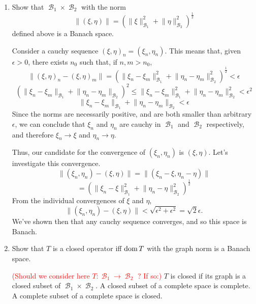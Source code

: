 \documentclass{article}
\theoremstyle{exercisestyle}
\newenvironment{exercise}[1]
  {\renewcommand\theinnerex{#1}\innerex}
  {\endinnerex}
\DeclareMathOperator{\banach}{\mathcal{B}}
\newcommand{\norm}[1]{\lVert #1 \rVert}
\begin{document}
\begin{exercise}{1.2.9}


    \begin{enumerate}

        \item Show that $\banach_1 \times \banach_2$ with the norm
              $$\norm{(\xi, \eta)} = \left(\norm{\xi}^2_{\banach_1} + \norm{\eta}^2_{\banach_2}\right)^{\frac{1}{2}}$$
              defined above is a Banach space.

              Consider a cauchy sequence $(\xi,\eta)_n=(\xi_n, \eta_n)$. This means that, given $\epsilon>0$, there exists $n_0$ such that, if $n, m > n_0$,
              $$ \norm{(\xi,\eta)_n - (\xi,\eta)_m} = \left(\norm{\xi_n - \xi_m}^2_{\banach_1} + \norm{\eta_n-\eta_m}^2_{\banach_2}\right)^{\frac{1}{2}} < \epsilon$$
              $$ \left(\norm{\xi_n-\xi_m}_{\banach_1} + \norm{\eta_n - \eta_m}_{\banach_2}\right)^2 \leq \norm{\xi_n-\xi_m}^2_{\banach_1} + \norm{\eta_n - \eta_m}^2_{\banach_2} < \epsilon^2$$
              $$ \norm{\xi_n-\xi_m}_{\banach_1} + \norm{\eta_n - \eta_m}_{\banach_2} < \epsilon$$
              Since the norms are necessarily positive, and are both smaller than arbitrary $\epsilon$, we can conclude that $\xi_n$ and $\eta_n$ are cauchy
              in $\banach_1$ and $\banach_2$ respectively, and therefore $\xi_n \to \xi$ and $\eta_n \to \eta$.

              Thus, our candidate for the convergence of $(\xi_n,\eta_n)$ is $(\xi,\eta)$. Let's investigate this convergence.
              $$ \norm{(\xi_n,\eta_n) - (\xi,\eta)} = \norm{(\xi_n-\xi,\eta_n-\eta)} $$
              $$ = \left(\norm{\xi_n-\xi}^2_{\banach_1} + \norm{\eta_n-\eta}^2_{\banach_2}\right)^{\frac{1}{2}}$$
              From the individual convergences of $\xi$ and $\eta$,
              $$ \norm{(\xi_n,\eta_n) - (\xi,\eta)} < \sqrt{\epsilon^2 + \epsilon^2} = \sqrt{2} \epsilon. $$
              We've shown then that any cauchy sequence converges, and so this space is Banach.


        \item Show that $T$ is a closed operator iff $\operatorname{dom} T$ with the graph norm is a Banach space.

              \textcolor{red}{(Should we consider here $T: \banach_1 \to \banach_2$ ? If so:)}
              $T$ is closed if its graph is a closed subset of $\banach_1 \times \banach_2$. A closed subset of a complete space is complete.
              A complete subset of a complete space is closed.
    \end{enumerate}

\end{exercise}
\end{document}
